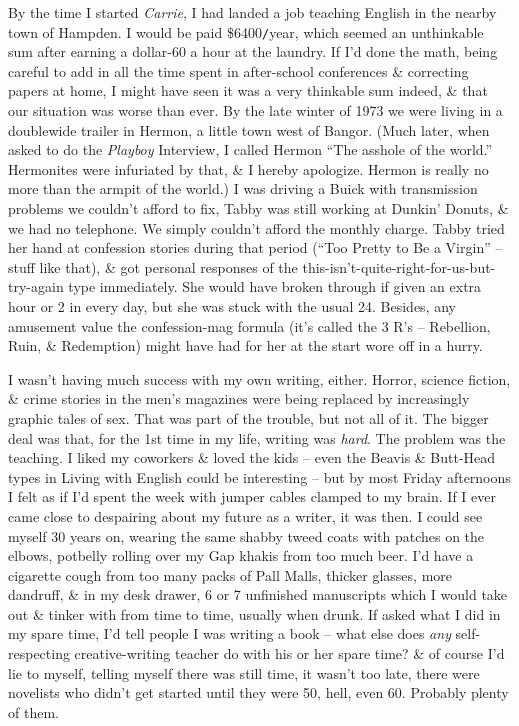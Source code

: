\documentclass{article}
\numberwithin{equation}{section}
\begin{document}
 By the time I started \textit{Carrie}, I had landed a job teaching English in the nearby town of Hampden. I would be paid \$6400{\tt/}year, which seemed an unthinkable sum after earning a dollar-60 a hour at the laundry. If I'd done the math, being careful to add in all the time spent in after-school conferences \& correcting papers at home, I might have seen it was a very thinkable sum indeed, \& that our situation was worse than ever. By the late winter of 1973 we were living in a doublewide trailer in Hermon, a little town west of Bangor. (Much later, when asked to do the \textit{Playboy} Interview, I called Hermon ``The asshole of the world.'' Hermonites were infuriated by that, \& I hereby apologize. Hermon is really no more than the armpit of the world.) I was driving a Buick with transmission problems we couldn't afford to fix, Tabby was still working at Dunkin' Donuts, \& we had no telephone. We simply couldn't afford the monthly charge. Tabby tried her hand at confession stories during that period (``Too Pretty to Be a Virgin'' -- stuff like that), \& got personal responses of the this-isn't-quite-right-for-us-but-try-again type immediately. She would have broken through if given an extra hour or 2 in every day, but she was stuck with the usual 24. Besides, any amusement value the confession-mag formula (it's called the 3 R's -- Rebellion, Ruin, \& Redemption) might have had for her at the start wore off in a hurry.

I wasn't having much success with my own writing, either. Horror, science fiction, \& crime stories in the men's magazines were being replaced by increasingly graphic tales of sex. That was part of the trouble, but not all of it. The bigger deal was that, for the 1st time in my life, writing was \textit{hard}. The problem was the teaching. I liked my coworkers \& loved the kids -- even the Beavis \& Butt-Head types in Living with English could be interesting -- but by most Friday afternoons I felt as if I'd spent the week with jumper cables clamped to my brain. If I ever came close to despairing about my future as a writer, it was then. I could see myself 30 years on, wearing the same shabby tweed coats with patches on the elbows, potbelly rolling over my Gap khakis from too much beer. I'd have a cigarette cough from too many packs of Pall Malls, thicker glasses, more dandruff, \& in my desk drawer, 6 or 7 unfinished manuscripts which I would take out \& tinker with from time to time, usually when drunk. If asked what I did in my spare time, I'd tell people I was writing a book -- what else does \textit{any} self-respecting creative-writing teacher do with his or her spare time? \& of course I'd lie to myself, telling myself there was still time, it wasn't too late, there were novelists who didn't get started until they were 50, hell, even 60. Probably plenty of them.
\end{document}
